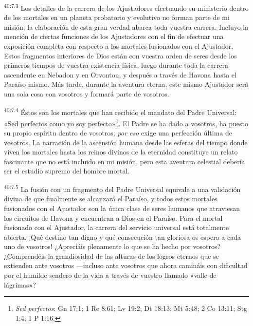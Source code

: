 \par
\textsuperscript{40:7.3} Los detalles de la carrera de los Ajustadores efectuando su ministerio dentro de los mortales en un planeta probatorio y evolutivo no forman parte de mi misión; la elaboración de esta gran verdad abarca toda vuestra carrera. Incluyo la mención de ciertas funciones de los Ajustadores con el fin de efectuar una exposición completa con respecto a los mortales fusionados con el Ajustador. Estos fragmentos interiores de Dios están con vuestra orden de seres desde los primeros tiempos de vuestra existencia física, luego durante toda la carrera ascendente en Nebadon y en Orvonton, y después a través de Havona hasta el Paraíso mismo. Más tarde, durante la aventura eterna, este mismo Ajustador será una sola cosa con vosotros y formará parte de vosotros.

\par
\textsuperscript{40:7.4} Éstos son los mortales que han recibido el mandato del Padre Universal: «Sed perfectos como yo soy perfecto»\footnote{\textit{Sed perfectos}: Gn 17:1; 1 Re 8:61; Lv 19:2; Dt 18:13; Mt 5:48; 2 Co 13:11; Stg 1:4; 1 P 1:16.}. El Padre se ha dado a vosotros, ha puesto su propio espíritu dentro de vosotros; \textit{por eso} exige una perfección última de vosotros. La narración de la ascensión humana desde las esferas del tiempo donde viven los mortales hasta los reinos divinos de la eternidad constituye un relato fascinante que no está incluido en mi misión, pero esta aventura celestial debería ser el estudio supremo del hombre mortal.

\par
\textsuperscript{40:7.5} La fusión con un fragmento del Padre Universal equivale a una validación divina de que finalmente se alcanzará el Paraíso, y todos estos mortales fusionados con el Ajustador son la única clase de seres humanos que atraviesan los circuitos de Havona y encuentran a Dios en el Paraíso. Para el mortal fusionado con el Ajustador, la carrera del servicio universal está totalmente abierta. ¡Qué destino tan digno y qué consecución tan gloriosa os espera a cada uno de vosotros! ¿Apreciáis plenamente lo que se ha hecho por vosotros? ¿Comprendéis la grandiosidad de las alturas de los logros eternos que se extienden ante vosotros ---incluso ante vosotros que ahora camináis con dificultad por el humilde sendero de la vida a través de vuestro llamado «valle de lágrimas»?

